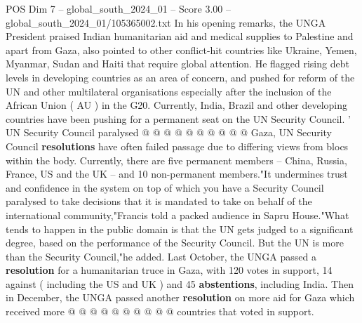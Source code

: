 \begin{textsample}{POS Dim 7 – global\_south\_2024\_01 – Score 3.00 – global\_south\_2024\_01/105365002.txt}
In his opening remarks, the UNGA President praised Indian humanitarian aid and medical supplies to Palestine and apart from Gaza, also pointed to other conflict-hit countries like Ukraine, Yemen, Myanmar, Sudan and Haiti that require global attention.
He flagged rising debt levels in developing countries as an area of concern, and pushed for reform of the UN and other multilateral organisations especially after the inclusion of the African Union ( AU ) in the G20.
Currently, India, Brazil and other developing countries have been pushing for a permanent seat on the UN Security Council. ' UN Security Council paralysed @ @ @ @ @ @ @ @ @ @ Gaza, UN Security Council \textbf{resolutions} have often failed passage due to differing views from blocs within the body.
Currently, there are five permanent members -- China, Russia, France, US and the UK -- and 10 non-permanent members."It undermines trust and confidence in the system on top of which you have a Security Council paralysed to take decisions that it is mandated to take on behalf of the international community,"Francis told a packed audience in Sapru House."What tends to happen in the public domain is that the UN gets judged to a significant degree, based on the performance of the Security Council.
But the UN is more than the Security Council,"he added.
Last October, the UNGA passed a \textbf{resolution} for a humanitarian truce in Gaza, with 120 votes in support, 14 against ( including the US and UK ) and 45 \textbf{abstentions}, including India.
Then in December, the UNGA passed another \textbf{resolution} on more aid for Gaza which received more @ @ @ @ @ @ @ @ @ @ countries that voted in support.

\end{textsample}
